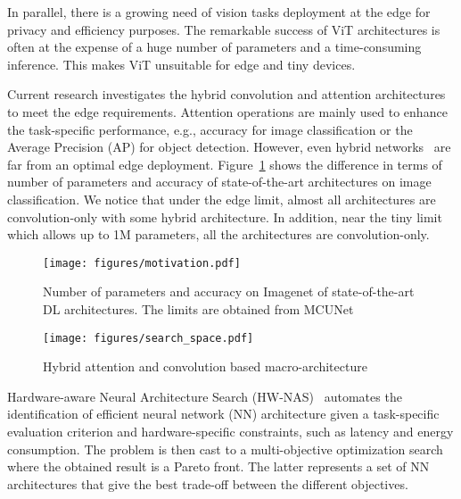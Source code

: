 \documentclass[conference]{IEEEtran}
\begin{document}
In parallel, there is a growing need of vision tasks deployment at the edge for privacy and efficiency purposes.
The remarkable success of ViT architectures is often at the expense of a huge number of parameters and a time-consuming inference. 
This makes ViT unsuitable for edge and tiny devices. 


Current research investigates the hybrid convolution and attention architectures to meet the edge requirements. 
Attention operations are mainly used to enhance the task-specific performance, e.g., accuracy for image classification or the Average Precision (AP) for object detection. 
However, even hybrid networks~\cite{convit, pit} are far from an optimal edge deployment.  
Figure~\ref{fig:1} shows the difference in terms of number of parameters and accuracy of state-of-the-art architectures on image classification. 
We notice that under the edge limit, almost all architectures are convolution-only with some hybrid architecture. 
In addition, near the tiny limit which allows up to 1M parameters, all the architectures are convolution-only. 

\begin{figure}
    \centering
    \texttt{[image: figures/motivation.pdf]}
    \caption{Number of parameters and accuracy on Imagenet of state-of-the-art DL architectures. The limits are obtained from MCUNet~\cite{DBLP:conf/nips/LinCLCG020}}
    
    \label{fig:1}
\end{figure}
\begin{figure*}[!ht]
    \centering    \texttt{[image: figures/search\_space.pdf]}
    \caption{Hybrid attention and convolution based macro-architecture}
    \label{fig:2}
\end{figure*}
Hardware-aware Neural Architecture Search (HW-NAS)~\cite{survey} automates the identification of efficient neural network (NN) architecture given a task-specific evaluation criterion and hardware-specific constraints, such as latency and energy consumption.
The problem is then cast to a multi-objective optimization search where the obtained result is a Pareto front. 
The latter represents a set of NN architectures that give the best trade-off between the different objectives. 
\end{document}
